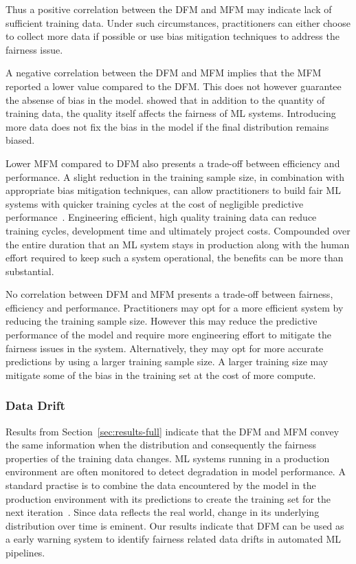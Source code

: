 \documentclass{article}
\begin{document}
Thus a positive correlation between the DFM and MFM may indicate lack
of sufficient training data. Under such circumstances, practitioners
can either choose to collect more data if possible or use bias
mitigation techniques to address the fairness issue. 

A negative correlation between the DFM and MFM implies that the MFM
reported a lower value compared to the DFM. This does not however
guarantee the absense of bias in the
model. \citeauthor{zhang2021ignorance} showed that in addition to the
quantity of training data, the quality itself affects the fairness of
ML systems. Introducing more data does not fix the bias in the model
if the final distribution remains biased.

Lower MFM compared to DFM also presents a trade-off between efficiency
and performance. A slight reduction in the training sample size, in
combination with appropriate bias mitigation techniques, can allow
practitioners to build fair ML systems with quicker training cycles at
the cost of negligible predictive
performance \cite{verdecchia2022data}. Engineering efficient, high
quality training data can reduce training cycles, development time and
ultimately project costs. Compounded over the entire duration that an
ML system stays in production along with the human effort required to
keep such a system operational, the benefits can be more than
substantial.

No correlation between DFM and MFM presents a trade-off between
fairness, efficiency and performance. Practitioners may opt for a more
efficient system by reducing the training sample size. However this
may reduce the predictive performance of the model and require more
engineering effort to mitigate the fairness issues in the system.
Alternatively, they may opt for more accurate predictions by using a
larger training sample size. A larger training size may mitigate some
of the bias in the training set at the cost of more compute.

\subsubsection{Data Drift}\label{sec:discuss-data-drift}

Results from Section \ref{sec:results-full} indicate that the DFM and
MFM convey the same information when the distribution and consequently
the fairness properties of the training data changes. ML systems
running in a production environment are often monitored to detect
degradation in model performance. A standard practise is to combine
the data encountered by the model in the production environment with
its predictions to create the training set for the next
iteration \cite{biessmann2021automated,breck2019data,schelter2018automating}. Since
data reflects the real world, change in its underlying distribution
over time is eminent. Our results indicate that DFM can be used as
a early warning system to identify fairness related data drifts in
automated ML pipelines.
\end{document}
